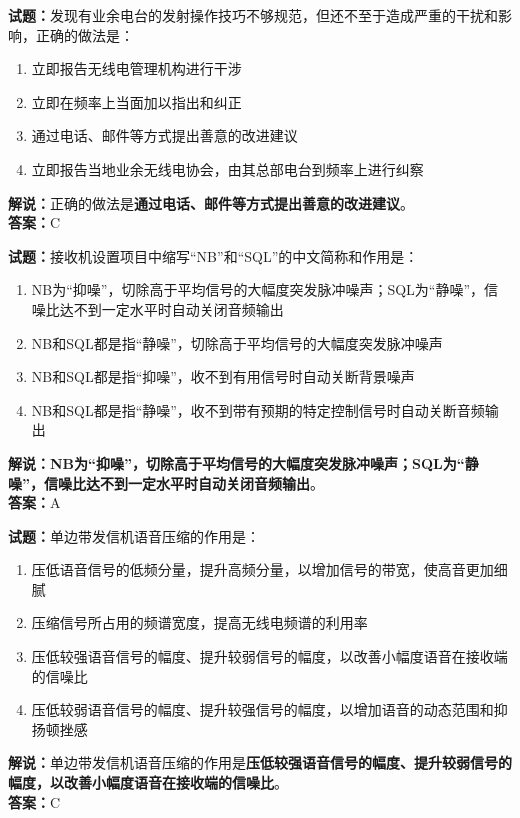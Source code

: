 \documentclass{ctexbook}
\begin{document}
\vspace{1em}

\textbf{试题：}发现有业余电台的发射操作技巧不够规范，但还不至于造成严重的干扰和影响，正确的做法是：
\begin{enumerate}[leftmargin=3em]
  \item 立即报告无线电管理机构进行干涉
  \item 立即在频率上当面加以指出和纠正
  \item 通过电话、邮件等方式提出善意的改进建议
  \item 立即报告当地业余无线电协会，由其总部电台到频率上进行纠察
\end{enumerate}
\noindent\textbf{解说：}正确的做法是\textbf{通过电话、邮件等方式提出善意的改进建议}。\\\noindent\textbf{答案：}C

\vspace{1em}

\textbf{试题：}接收机设置项目中缩写“NB”和“SQL”的中文简称和作用是：
\begin{enumerate}[leftmargin=3em]
  \item NB为“抑噪”，切除高于平均信号的大幅度突发脉冲噪声；SQL为“静噪”，信噪比达不到一定水平时自动关闭音频输出
  \item NB和SQL都是指“静噪”，切除高于平均信号的大幅度突发脉冲噪声
  \item NB和SQL都是指“抑噪”，收不到有用信号时自动关断背景噪声
  \item NB和SQL都是指“静噪”，收不到带有预期的特定控制信号时自动关断音频输出
\end{enumerate}
\noindent\textbf{解说：}\textbf{NB为“抑噪”，切除高于平均信号的大幅度突发脉冲噪声；SQL为“静噪”，信噪比达不到一定水平时自动关闭音频输出}。\\\noindent\textbf{答案：}A

\vspace{1em}

\textbf{试题：}单边带发信机语音压缩的作用是：
\begin{enumerate}[leftmargin=3em]
  \item 压低语音信号的低频分量，提升高频分量，以增加信号的带宽，使高音更加细腻
  \item 压缩信号所占用的频谱宽度，提高无线电频谱的利用率
  \item 压低较强语音信号的幅度、提升较弱信号的幅度，以改善小幅度语音在接收端的信噪比
  \item 压低较弱语音信号的幅度、提升较强信号的幅度，以增加语音的动态范围和抑扬顿挫感
\end{enumerate}
\noindent\textbf{解说：}单边带发信机语音压缩的作用是\textbf{压低较强语音信号的幅度、提升较弱信号的幅度，以改善小幅度语音在接收端的信噪比}。\\\noindent\textbf{答案：}C
\end{document}
